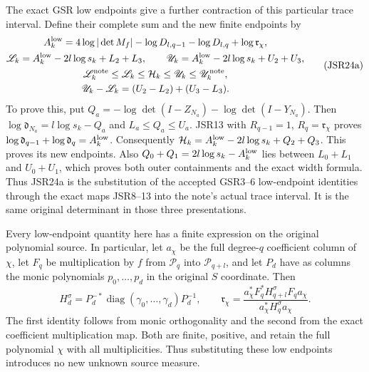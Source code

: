 \documentclass[11pt,a4paper]{article}
\newcommand{\diag}{\operatorname{diag}}
\begin{document}
The exact GSR low endpoints give a further contraction of
this particular trace interval. Define their complete sum
and the new finite endpoints by
\[
\begin{gathered}
 A_k^{\rm low}=4\log|\det M_f|-
 \log D_{l,q-1}-\log D_{l,q}+\log\mathfrak r_\chi,\\
 \mathscr L_k=A_k^{\rm low}-2l\log s_k+L_2+L_3,\qquad
 \mathscr U_k=A_k^{\rm low}-2l\log s_k+U_2+U_3,\\
 \mathscr L_k^{\rm note}\leq\mathscr L_k
 \leq\mathcal H_k\leq\mathscr U_k
 \leq\mathscr U_k^{\rm note},\\
 \mathscr U_k-\mathscr L_k=(U_2-L_2)+(U_3-L_3).
\end{gathered}\tag{JSR24a}
\]
To prove this, put
$Q_a=-\log\det(I-Z_{N_a})-\log\det(I-Y_{N_a})$.
Then $\log\mathfrak d_{N_a}=l\log s_k-Q_a$ and
$L_a\leq Q_a\leq U_a$. JSR13 with
$R_{q-1}=1$, $R_q=\mathfrak r_\chi$ proves
$\log\mathfrak d_{q-1}+\log\mathfrak d_q=A_k^{\rm low}$.
Consequently
$\mathcal H_k=A_k^{\rm low}-2l\log s_k+Q_2+Q_3$.
This proves its new endpoints. Also
$Q_0+Q_1=2l\log s_k-A_k^{\rm low}$ lies between
$L_0+L_1$ and $U_0+U_1$, which proves both outer
containments and the exact width formula.
Thus JSR24a is the substitution of the accepted GSR3--6
low-endpoint identities through the exact maps JSR8--13
into the note's actual trace interval. It is the same
original determinant in those three presentations.

Every low-endpoint quantity here has a finite expression
on the original polynomial source. In particular, let
$a_\chi$ be the full degree-$q$ coefficient column of
$\chi$, let $F_q$ be multiplication by $f$ from
$\mathcal P_q$ into $\mathcal P_{q+l}$, and let $P_d$
have as columns the monic polynomials $p_0,\ldots,p_d$
in the original $S$ coordinate. Then
\[
 H_d^\sigma=P_d^{-*}\diag(\gamma_0,\ldots,\gamma_d)P_d^{-1},
 \qquad
 \mathfrak r_\chi=
 \frac{a_\chi^*F_q^*H_{q+l}^\sigma F_qa_\chi}
      {a_\chi^*H_q^\sigma a_\chi}.
 \tag{JSR24b}
\]
The first identity follows from monic orthogonality and
the second from the exact coefficient multiplication map.
Both are finite, positive, and retain the full polynomial
$\chi$ with all multiplicities. Thus substituting these
low endpoints introduces no new unknown source measure.
\end{document}
